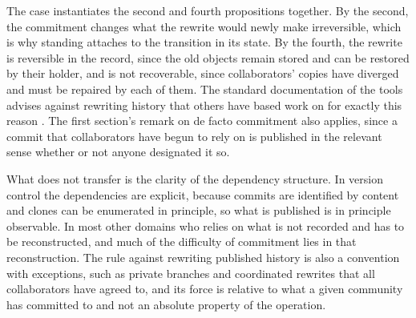 The case instantiates the second and fourth propositions together. By the second, the commitment changes what the rewrite would newly make irreversible, which is why standing attaches to the transition in its state. By the fourth, the rewrite is reversible in the record, since the old objects remain stored and can be restored by their holder, and is not recoverable, since collaborators' copies have diverged and must be repaired by each of them. The standard documentation of the tools advises against rewriting history that others have based work on for exactly this reason \cite{gitrebase}. The first section's remark on de facto commitment also applies, since a commit that collaborators have begun to rely on is published in the relevant sense whether or not anyone designated it so.

What does not transfer is the clarity of the dependency structure. In version control the dependencies are explicit, because commits are identified by content and clones can be enumerated in principle, so what is published is in principle observable. In most other domains who relies on what is not recorded and has to be reconstructed, and much of the difficulty of commitment lies in that reconstruction. The rule against rewriting published history is also a convention with exceptions, such as private branches and coordinated rewrites that all collaborators have agreed to, and its force is relative to what a given community has committed to and not an absolute property of the operation.
